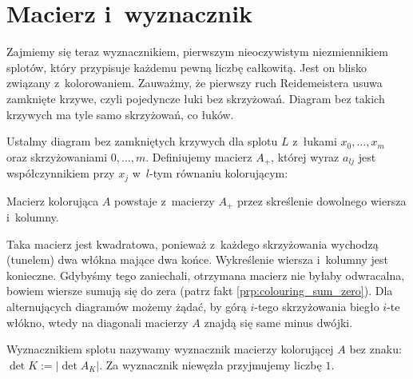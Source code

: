 \section{Macierz i~wyznacznik} %
\label{sec:colour_matrix}
Zajmiemy się teraz wyznacznikiem, pierwszym nieoczywistym niezmiennikiem splotów, który przypisuje każdemu pewną liczbę całkowitą.
Jest on blisko związany z~kolorowaniem.
Zauważmy, że pierwszy ruch Reidemeistera usuwa zamknięte krzywe, czyli pojedyncze łuki bez skrzyżowań.
Diagram bez takich krzywych ma tyle samo skrzyżowań, co łuków.

\begin{definition}
    Ustalmy diagram bez zamkniętych krzywych dla splotu $L$ z~łukami $x_0, \ldots, x_m$ oraz skrzyżowaniami $0, \ldots, m$.
    Definiujemy macierz $A_+$, której wyraz $a_{lj}$ jest współczynnikiem przy $x_j$ w~$l$-tym równaniu kolorującym:
\begin{comment}
    \[\begin{tikzpicture}[baseline=-0.65ex, scale=0.12]
    \useasboundingbox (-5, -10) rectangle (5,5);
    \begin{knot}[clip width=5, end tolerance=1pt, flip crossing/.list={1}]
        \strand[semithick] (-5,5) to (5,-5);
        \strand[semithick] (-5,-5) to (5,5);
        \node[darkblue] at (5, 5)[below right] {$x_i$};
        \node[darkblue] at (5, -5)[above right] {$x_j$};
        \node[darkblue] at (-5, 5)[below left] {$x_k$};
        \node[black] at (0, -7)[below] {$x_j+x_k - 2x_i \equiv 0 \mod n$};
    \end{knot}
    \end{tikzpicture}\]
\end{comment}
    Macierz kolorująca $A$ powstaje z~macierzy $A_+$ przez skreślenie dowolnego wiersza i~kolumny.
\end{definition}

Taka macierz jest kwadratowa, ponieważ z~każdego skrzyżowania wychodzą (tunelem) dwa włókna mające dwa końce.
Wykreślenie wiersza i~kolumny jest konieczne.
Gdybyśmy tego zaniechali, otrzymana macierz nie byłaby odwracalna, bowiem wiersze sumują się do zera (patrz fakt \ref{prp:colouring_sum_zero}).
Dla alternujących diagramów możemy żądać, by górą $i$-tego skrzyżowania biegło $i$-te włókno, wtedy na diagonali macierzy $A$ znajdą się same minus dwójki.

\begin{definition}[wyznacznik]
    \label{def:determinant}
    Wyznacznikiem splotu nazywamy wyznacznik macierzy kolorującej $A$ bez znaku: $\det K := |\det A_K|$.
    Za wyznacznik niewęzła przyjmujemy liczbę $1$.
\end{definition}

